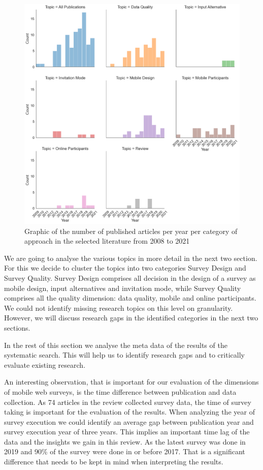 \begin{figure}
    \centering
    \includegraphics[width=\textwidth]{reports/figures/publications_per_year_per_categories.png}
     \caption{Graphic of the number of published articles per year per category of approach in the selected literature from 2008 to 2021}
    \label{fig: publications_per_year_per_categories}
\end{figure}

We are going to analyse the various topics in more detail in the next two section. For this we decide to cluster the topics into two categories Survey Design and Survey Quality. Survey Design comprises all decision in the design of a survey as mobile design, input alternatives and invitation mode, while Survey Quality comprises all the quality dimension: data quality, mobile and online participants. We could not identify missing research topics on this level on granularity. However, we will discuss research gaps in the identified categories in the next two sections. 

In the rest of this section we analyse the meta data of the results of the systematic search. This will help us to identify research gaps and to critically evaluate existing research.

An interesting observation, that is important for our evaluation of the dimensions of mobile web surveys, is the time difference between publication and data collection. As 74 articles in the review collected survey data, the time of survey taking is important for the evaluation of the results. When analyzing the year of survey execution we could identify an average gap between publication year and survey execution year of three years. This implies an important time lag of the data and the insights we gain in this review. As the latest survey was done in 2019 and 90\% of the survey were done in or before 2017. That is a significant difference that needs to be kept in mind when interpreting the results.  

